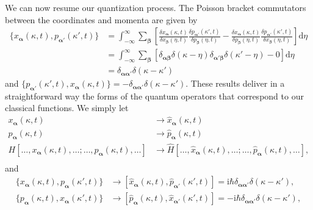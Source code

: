 \documentclass{article}
\numberwithin{equation}{section}
\begin{document}
We can now resume our quantization process. The Poisson bracket commutators between the coordinates and momenta are given by 
\begin{equation}
\begin{split}
\{x_{\bm{\alpha}}(\kappa,t),p_{\bm{\alpha}'}(\kappa',t)\} &= \int_{-\infty}^\infty\sum_{\bm{\beta}}\left[\frac{\delta x_{\bm{\alpha}}(\kappa,t)}{\delta x_{\bm{\beta}}(\eta,t)}\frac{\delta p_{\bm{\alpha}'}(\kappa',t)}{\delta p_{\bm{\beta}}(\eta,t)} - \frac{\delta x_{\bm{\alpha}}(\kappa,t)}{\delta p_{\bm{\beta}}(\eta,t)}\frac{\delta p_{\bm{\alpha}'}(\kappa',t)}{\delta x_{\bm{\beta}}(\eta,t)}\right]\mathrm{d}\eta\\
&= \int_{-\infty}^\infty\sum_{\bm{\beta}}\left[\delta_{\bm{\alpha}\bm{\beta}}\delta(\kappa - \eta)\delta_{\bm{\alpha}'\bm{\beta}}\delta(\kappa' - \eta) - 0\right]\mathrm{d}\eta\\
&= \delta_{\bm{\alpha}\bm{\alpha}'}\delta(\kappa - \kappa')
\end{split}
\end{equation}
and $\{p_{\bm{\alpha}'}(\kappa',t),x_{\bm{\alpha}}(\kappa,t)\} = -\delta_{\bm{\alpha}\bm{\alpha}'}\delta(\kappa - \kappa')$. These results deliver in a straightforward way the forms of the quantum operators that correspond to our classical functions. We simply let
\begin{equation}
\begin{split}
x_{\bm{\alpha}}(\kappa,t) &\to \hat{x}_{\bm{\alpha}}(\kappa,t)\\
p_{\bm{\alpha}}(\kappa,t) &\to \hat{p}_{\bm{\alpha}}(\kappa,t)\\
H[\ldots,x_{\bm{\alpha}}(\kappa,t),\ldots;\ldots,p_{\bm{\alpha}}(\kappa,t),\ldots] &\to \hat{H}[\ldots,\hat{x}_{\bm{\alpha}}(\kappa,t),\ldots;\ldots,\hat{p}_{\bm{\alpha}}(\kappa,t),\ldots],\\
\end{split}
\end{equation}
and
\begin{equation}\label{eq:xpCommutator}
\begin{split}
\{x_{\bm{\alpha}}(\kappa,t),p_{\bm{\alpha}}(\kappa',t)\} &\to [\hat{x}_{\bm{\alpha}}(\kappa,t),\hat{p}_{\bm{\alpha}'}(\kappa',t)] = \mathrm{i}\hbar\delta_{\bm{\alpha}\bm{\alpha}'}\delta(\kappa - \kappa'),\\
\{p_{\bm{\alpha}}(\kappa,t),x_{\bm{\alpha}}(\kappa',t)\} &\to [\hat{p}_{\bm{\alpha}}(\kappa,t),\hat{x}_{\bm{\alpha}'}(\kappa',t)] = -\mathrm{i}\hbar\delta_{\bm{\alpha}\bm{\alpha}'}\delta(\kappa - \kappa'),
\end{split}
\end{equation}
\end{document}
